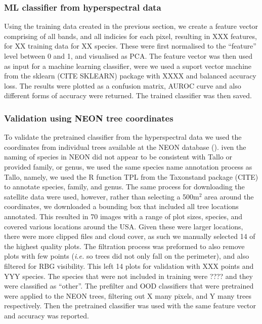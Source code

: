 \documentclass[9pt,lineno]{elife}
\begin{document}
\subsubsection{ML classifier from hyperspectral data}
Using the training data created in the previous section, we create a feature vector comprising of all bands, and all indicies for each pixel, resulting in XXX features, for XX training data for XX species. These were first normalised to the ``feature'' level between 0 and 1, and visualised as PCA. The feature vector was then used as input for a machine learning classifier, were we used a suport vector machine from the sklearn (CITE SKLEARN) package with XXXX and balanced accuracy loss. The results were plotted as a confusion matrix, AUROC curve and also different forms of accuracy were returned. The trained classifier was then saved.

\subsubsection{Validation using NEON tree coordinates}
To validate the pretrained classifier from the hyperspectral data we used the coordinates from individual trees available at the NEON database (\cite{NEON}). iven the naming of species in NEON did not appear to be consistent with Tallo or provided family, or genus, we used the same species name annotation process as Tallo, namely, we used the R function TPL from the Taxonstand package (CITE) to annotate species, family, and genus. The same process for downloading the satellite data were used, however, rather than selecting a 500m$^2$ area around the coordinates, we downloaded a bounding box that included all tree locations annotated. This resulted in 70 images with a range of plot sizes, species, and covered various locations around the USA. Given these were larger locations, there were more clipped files and cloud cover, as such we manually selected 14 of the highest quality plots. The filtration process was preformed to also remove plots with few points (\textit{i.e.} so trees did not only fall on the perimeter), and also filtered for RBG visibility. This left 14 plots for validation with XXX points and YYY species. The species that were not included in training were ???? and they were classified as ``other''. The prefilter and OOD classifiers that were pretrained were applied to the NEON trees, filtering out X many pixels, and Y many trees respectively. Then the pretrained classifier was used with the same feature vector and accuracy was reported.
\end{document}
